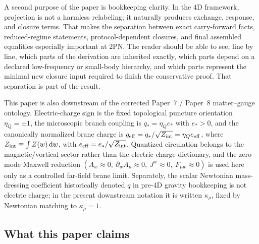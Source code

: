 \documentclass[11pt]{article}
\newcommand{\dd}{\mathrm d}
\newcommand{\etaQ}{\eta_Q}
\newcommand{\qstar}{q_*}
\newcommand{\estar}{e_*}
\newcommand{\qeff}{q_{\mathrm{eff}}}
\newcommand{\eeff}{e_{\mathrm{eff}}}
\newcommand{\krho}{\kappa_{\rho}}
\begin{document}
A second purpose of the paper is bookkeeping clarity.
In the $4$D framework, projection is not a harmless relabeling; it naturally produces exchange, response, and closure terms.
That makes the separation between exact carry-forward facts, reduced-regime statements, protocol-dependent closures, and final assembled equalities especially important at $2$PN.
The reader should be able to see, line by line, which parts of the derivation are inherited exactly, which parts depend on a declared low-frequency or small-body hierarchy, and which parts represent the minimal new closure input required to finish the conservative proof.
That separation is part of the result.

This paper is also downstream of the corrected Paper~7 / Paper~8 matter--gauge
ontology. Electric-charge sign is the fixed topological puncture orientation
\(\etaQ=\pm1\), the microscopic branch coupling is \(\qstar=\etaQ\estar\) with
\(\estar>0\), and the canonically normalized brane charge is
\(\qeff=\qstar/\sqrt{Z_{\rm int}}=\etaQ\eeff\), where
\(Z_{\rm int}\equiv\int Z(w)\,\dd w\), with
\(\eeff=\estar/\sqrt{Z_{\rm int}}\). Quantized circulation belongs to the
magnetic/vortical sector rather than the electric-charge dictionary, and the
zero-mode Maxwell reduction
\((A_w\approx0,\ \partial_w A_\mu\approx0,\ J^w\approx0,\ F_{\mu w}\approx0)\)
is used here only as a controlled far-field brane limit. Separately, the
scalar Newtonian mass-dressing coefficient historically denoted \(q\) in pre-4D
gravity bookkeeping is not electric charge; in the present downstream notation
it is written \(\krho\), fixed by Newtonian matching to \(\krho=1\).

\subsection{What this paper claims}
\label{sec:intro-claims}
\end{document}
